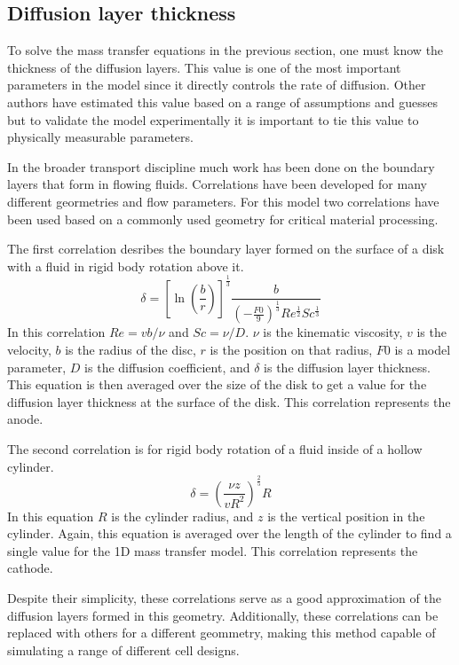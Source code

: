 \documentclass[journal=mamobx, layout=twocolumn]{achemso}
\begin{document}
\subsection{Diffusion layer thickness}
To solve the mass transfer equations in the previous section, one must know the thickness of the diffusion layers.
This value is one of the most important parameters in the model since it directly controls the rate of diffusion. 
Other authors have estimated this value based on a range of assumptions and guesses but to validate the model experimentally it is important to tie this value to physically measurable parameters.

In the broader transport discipline much work has been done on the boundary layers that form in flowing fluids. 
Correlations have been developed for many different geormetries and flow parameters.
For this model two correlations have been used based on a commonly used geometry for critical material processing. 

The first correlation desribes the boundary layer formed on the surface of a disk with a fluid in rigid body rotation above it\cite{Smith_1972}.
\begin{equation}
    \delta = \left [\ln\left(\frac{b}{r}\right )\right]^\frac{1}{3}\frac{b}{\left(-\frac{F0}{9}\right)^\frac{1}{3}Re^\frac{1}{2}Sc^\frac{1}{3}}
    \label{eq:disk}
\end{equation}
In this correlation $Re = vb/\nu$ and $Sc = \nu/D$. $\nu$ is the kinematic viscosity, $v$ is the velocity, $b$ is the radius of the disc, $r$ is the position on that radius, $F0$ is a model parameter, $D$ is the diffusion coefficient, and $\delta$ is the diffusion layer thickness.
This equation is then averaged over the size of the disk to get a value for the diffusion layer thickness at the surface of the disk. 
This correlation represents the anode.

The second correlation is for rigid body rotation of a fluid inside of a hollow cylinder\cite{Rott1966}.
\begin{equation}
    \delta = \left ( \frac{\nu z}{vR^2}\right )^\frac{2}{5} R
    \label{eq:cylinder}
\end{equation}
In this equation $R$ is the cylinder radius, and $z$ is the vertical position in the cylinder. 
Again, this equation is averaged over the length of the cylinder to find a single value for the 1D mass transfer model. 
This correlation represents the cathode. 

Despite their simplicity, these correlations serve as a good approximation of the diffusion layers formed in this geometry. 
Additionally, these correlations can be replaced with others for a different geommetry, making this method capable of simulating a range of different cell designs. 
\end{document}
